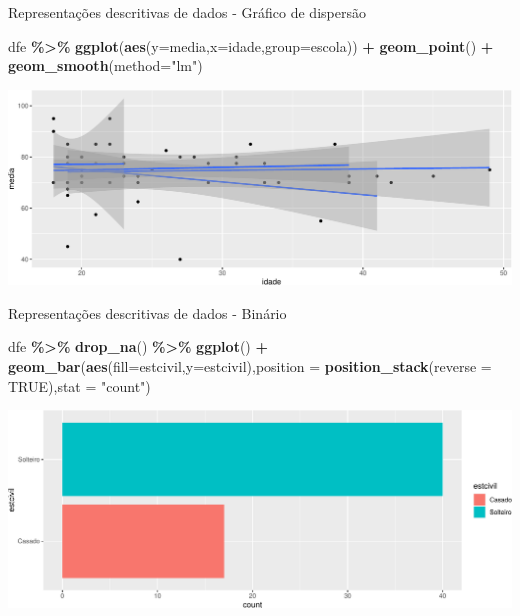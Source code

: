 \documentclass[
  9pt,
  ignorenonframetext,
  aspectratio=169]{beamer}
\newenvironment{Shaded}{\begin{snugshade}}{\end{snugshade}}
\newcommand{\DataTypeTok}[1]{\textcolor[rgb]{0.13,0.29,0.53}{#1}}
\newcommand{\KeywordTok}[1]{\textcolor[rgb]{0.13,0.29,0.53}{\textbf{#1}}}
\newcommand{\NormalTok}[1]{#1}
\newcommand{\OperatorTok}[1]{\textcolor[rgb]{0.81,0.36,0.00}{\textbf{#1}}}
\newcommand{\OtherTok}[1]{\textcolor[rgb]{0.56,0.35,0.01}{#1}}
\newcommand{\StringTok}[1]{\textcolor[rgb]{0.31,0.60,0.02}{#1}}
\begin{document}
\begin{frame}[fragile]{Representações descritivas de dados - Gráfico de
dispersão}
\protect\hypertarget{representauxe7uxf5es-descritivas-de-dados---gruxe1fico-de-dispersuxe3o}{}
\begin{Shaded}
\begin{Highlighting}[]
\NormalTok{dfe }\OperatorTok{\%\textgreater{}\%}
\StringTok{  }\KeywordTok{ggplot}\NormalTok{(}\KeywordTok{aes}\NormalTok{(}\DataTypeTok{y=}\NormalTok{media,}\DataTypeTok{x=}\NormalTok{idade,}\DataTypeTok{group=}\NormalTok{escola)) }\OperatorTok{+}
\StringTok{  }\KeywordTok{geom\_point}\NormalTok{() }\OperatorTok{+}
\StringTok{  }\KeywordTok{geom\_smooth}\NormalTok{(}\DataTypeTok{method=}\StringTok{"lm"}\NormalTok{)}
\end{Highlighting}
\end{Shaded}

\includegraphics{aula_08_files/figure-beamer/unnamed-chunk-6-1.pdf}
\end{frame}

\begin{frame}[fragile]{Representações descritivas de dados - Binário}
\protect\hypertarget{representauxe7uxf5es-descritivas-de-dados---binuxe1rio}{}
\begin{Shaded}
\begin{Highlighting}[]
\NormalTok{dfe }\OperatorTok{\%\textgreater{}\%}
\StringTok{  }\KeywordTok{drop\_na}\NormalTok{() }\OperatorTok{\%\textgreater{}\%}
\StringTok{  }\KeywordTok{ggplot}\NormalTok{() }\OperatorTok{+}
\StringTok{  }\KeywordTok{geom\_bar}\NormalTok{(}\KeywordTok{aes}\NormalTok{(}\DataTypeTok{fill=}\NormalTok{estcivil,}\DataTypeTok{y=}\NormalTok{estcivil),}\DataTypeTok{position =} \KeywordTok{position\_stack}\NormalTok{(}\DataTypeTok{reverse =} \OtherTok{TRUE}\NormalTok{),}\DataTypeTok{stat =} \StringTok{"count"}\NormalTok{)}
\end{Highlighting}
\end{Shaded}

\includegraphics{aula_08_files/figure-beamer/unnamed-chunk-7-1.pdf}
\end{frame}
\end{document}
